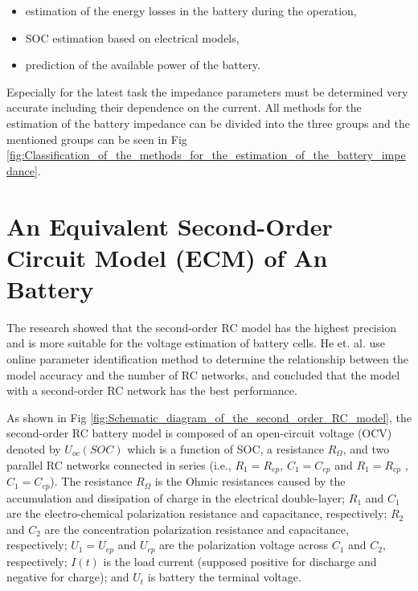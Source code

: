 \documentclass[12pt]{article}
\begin{document}
\begin{itemize}
	\item estimation of the energy losses in the battery during the
operation,
	\item SOC estimation based on electrical models,
	\item prediction of the available power of the battery.
\end{itemize}

\par \noindent Especially for the latest task the impedance parameters must be determined very accurate including their dependence on the current. All methods for the estimation of the battery impedance can be divided into the three groups and the mentioned groups can be seen in Fig \ref{fig:Classification_of_the_methods_for_the_estimation_of_the_battery_impedance}.

\section{An Equivalent Second-Order Circuit Model (ECM) of An Battery} \label{Model}
The research showed that the second-order RC model has the highest precision and is more suitable for the voltage estimation of battery cells. He et. al. \cite{He2012} use online parameter identification method to determine the relationship between the model accuracy and the number of RC networks, and concluded that the model with a second-order RC network has the best performance. \newline

\par \noindent As shown in Fig \ref{fig:Schematic_diagram_of_the_second_order_RC_model}, the second-order
RC battery model is composed of an open-circuit voltage (OCV) denoted by $U_{oc}(SOC)$ which is a function of SOC, a resistance $R_{\Omega}$,
 and two parallel RC networks connected in series (i.e., $R_{1}=R_{ep}$, $C_{1}=C_{ep}$ and $R_{1}=R_{cp}$ ,$C_{1}=C_{cp}$). The resistance $R_{\Omega}$ is the Ohmic resistances caused by the accumulation and dissipation of charge in the electrical double-layer; $R_{1}$
and $C_{1}$ are the electro-chemical polarization resistance and capacitance, respectively; $R_{2}$ and $C_{2}$ are
the concentration polarization resistance and capacitance, respectively; $U_{1}=U_{ep}$ and $U_{cp}$ are the polarization
 voltage across $C_{1}$ and $C_{2}$, respectively; $I(t)$ is the load current (supposed positive for discharge and
negative for charge); and $U_{t}$ is battery the terminal voltage. \newline
\end{document}
